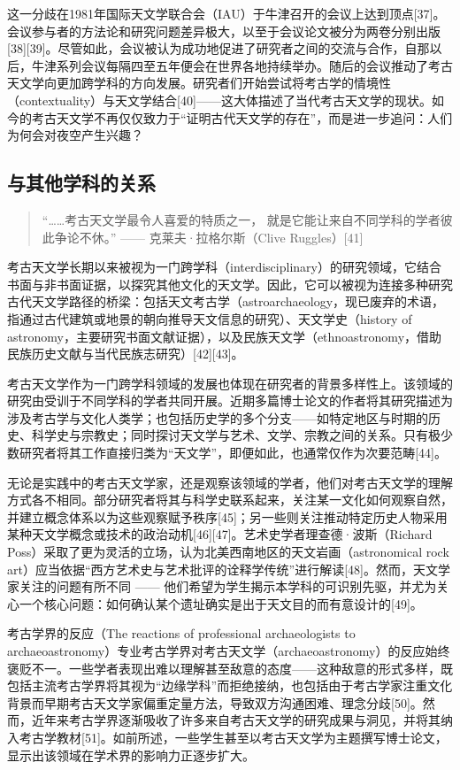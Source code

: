 这一分歧在1981年国际天文学联合会（IAU）于牛津召开的会议上达到顶点[37]。会议参与者的方法论和研究问题差异极大，以至于会议论文被分为两卷分别出版[38][39]。尽管如此，会议被认为成功地促进了研究者之间的交流与合作，自那以后，牛津系列会议每隔四至五年便会在世界各地持续举办。随后的会议推动了考古天文学向更加跨学科的方向发展。研究者们开始尝试将考古学的情境性（contextuality）与天文学结合[40]——这大体描述了当代考古天文学的现状。如今的考古天文学不再仅仅致力于“证明古代天文学的存在”，而是进一步追问：人们为何会对夜空产生兴趣？
\subsection{与其他学科的关系}
\begin{quote}
“……考古天文学最令人喜爱的特质之一，  
就是它能让来自不同学科的学者彼此争论不休。”  
\hfill —— 克莱夫·拉格尔斯（Clive Ruggles）[41]
\end{quote}
考古天文学长期以来被视为一门跨学科（interdisciplinary）的研究领域，它结合书面与非书面证据，以探究其他文化的天文学。因此，它可以被视为连接多种研究古代天文学路径的桥梁：包括天文考古学（astroarchaeology，现已废弃的术语，指通过古代建筑或地景的朝向推导天文信息的研究）、天文学史（history of astronomy，主要研究书面文献证据），以及民族天文学（ethnoastronomy，借助民族历史文献与当代民族志研究）[42][43]。

考古天文学作为一门跨学科领域的发展也体现在研究者的背景多样性上。该领域的研究由受训于不同学科的学者共同开展。近期多篇博士论文的作者将其研究描述为涉及考古学与文化人类学；也包括历史学的多个分支——如特定地区与时期的历史、科学史与宗教史；同时探讨天文学与艺术、文学、宗教之间的关系。只有极少数研究者将其工作直接归类为“天文学”，即便如此，也通常仅作为次要范畴[44]。

无论是实践中的考古天文学家，还是观察该领域的学者，他们对考古天文学的理解方式各不相同。部分研究者将其与科学史联系起来，关注某一文化如何观察自然，并建立概念体系以为这些观察赋予秩序[45]；另一些则关注推动特定历史人物采用某种天文学概念或技术的政治动机[46][47]。艺术史学者理查德·波斯（Richard Poss）采取了更为灵活的立场，认为北美西南地区的天文岩画（astronomical rock art）应当依据“西方艺术史与艺术批评的诠释学传统”进行解读[48]。然而，天文学家关注的问题有所不同 —— 他们希望为学生揭示本学科的可识别先驱，并尤为关心一个核心问题：如何确认某个遗址确实是出于天文目的而有意设计的[49]。

考古学界的反应（The reactions of professional archaeologists to archaeoastronomy）专业考古学界对考古天文学（archaeoastronomy）的反应始终褒贬不一。一些学者表现出难以理解甚至敌意的态度——这种敌意的形式多样，既包括主流考古学界将其视为“边缘学科”而拒绝接纳，也包括由于考古学家注重文化背景而早期考古天文学家偏重定量方法，导致双方沟通困难、理念分歧[50]。然而，近年来考古学界逐渐吸收了许多来自考古天文学的研究成果与洞见，并将其纳入考古学教材[51]。如前所述，一些学生甚至以考古天文学为主题撰写博士论文，显示出该领域在学术界的影响力正逐步扩大。

